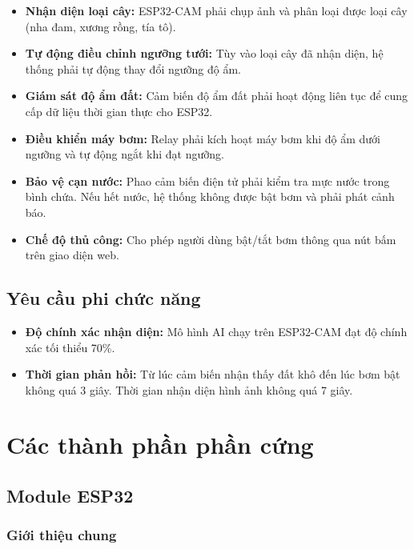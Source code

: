 \documentclass[12pt,a4paper]{report}
\begin{document}
\begin{itemize}
    \item \textbf{Nhận diện loại cây:} ESP32-CAM phải chụp ảnh và phân loại được
    loại cây (nha đam, xương rồng, tía tô).
    \item \textbf{Tự động điều chỉnh ngưỡng tưới:} Tùy vào loại cây đã nhận diện,
    hệ thống phải tự động thay đổi ngưỡng độ ẩm.
    \item \textbf{Giám sát độ ẩm đất:} Cảm biến độ ẩm đất phải hoạt động liên tục
    để cung cấp dữ liệu thời gian thực cho ESP32.
    \item \textbf{Điều khiển máy bơm:} Relay phải kích hoạt máy bơm khi độ ẩm dưới
    ngưỡng và tự động ngắt khi đạt ngưỡng.
    \item \textbf{Bảo vệ cạn nước:} Phao cảm biến điện tử phải kiểm tra mực nước
    trong bình chứa. Nếu hết nước, hệ thống không được bật bơm và phải phát cảnh báo.
    \item \textbf{Chế độ thủ công:} Cho phép người dùng bật/tắt bơm thông qua nút
    bấm trên giao diện web.
\end{itemize}

\subsection{Yêu cầu phi chức năng}

\begin{itemize}
    \item \textbf{Độ chính xác nhận diện:} Mô hình AI chạy trên ESP32-CAM đạt độ
    chính xác tối thiểu 70\%.
    \item \textbf{Thời gian phản hồi:} Từ lúc cảm biến nhận thấy đất khô đến lúc
    bơm bật không quá 3 giây. Thời gian nhận diện hình ảnh không quá 7 giây.
\end{itemize}

\section{Các thành phần phần cứng}

\subsection{Module ESP32}

\subsubsection{Giới thiệu chung}
\end{document}
